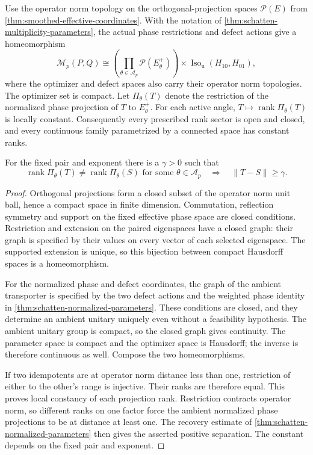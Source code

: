 \begin{theorem}
\label{thm:schatten-optimizer-topology}
Use the operator norm topology on the orthogonal-projection spaces
$\mathcal P(E)$ from \cref{thm:smoothed-effective-coordinates}.
With the notation of
\cref{thm:schatten-multiplicity-parameters}, the actual phase restrictions
and defect actions give a homeomorphism
\[
 \mathcal M_p(P,Q)\cong
 \left(\prod_{\theta\in\mathcal A_p}\mathcal P(E_\theta^+)\right)
       \times\operatorname{Iso}_{\mathrm u}(H_{10},H_{01}),
\]
where the optimizer and defect spaces also carry their operator norm
topologies. The optimizer set is compact. Let $\Pi_\theta(T)$ denote the
restriction of the normalized phase projection of $T$ to $E_\theta^+$.
For each active angle,
$T\mapsto\operatorname{rank}\Pi_\theta(T)$ is locally constant.
Consequently every prescribed rank sector is open and closed, and every
continuous family parametrized by a connected space has constant ranks.

For the fixed pair and exponent there is a $\gamma>0$ such that
\[
 \operatorname{rank}\Pi_\theta(T)\ne
 \operatorname{rank}\Pi_\theta(S)\text{ for some }\theta\in\mathcal A_p
 \quad\Longrightarrow\quad \|T-S\|\geq\gamma.
\]
\end{theorem}

\begin{proof}
Orthogonal projections form a closed subset of the operator norm unit
ball, hence a compact space in finite dimension. Commutation, reflection
symmetry and support on the fixed effective phase space are closed
conditions. Restriction and extension on the paired eigenspaces have a
closed graph: their graph is specified by their values on every vector
of each selected eigenspace. The supported extension is unique, so this
bijection between compact Hausdorff spaces is a homeomorphism.

For the normalized phase and defect coordinates, the graph of the
ambient transporter is specified by the two defect actions and the
weighted phase identity in \cref{thm:schatten-normalized-parameters}.
These conditions are closed, and they determine an ambient unitary
uniquely even without a feasibility hypothesis. The ambient unitary group
is compact, so the closed graph gives continuity. The parameter space
is compact and the optimizer space is Hausdorff; the inverse is therefore
continuous as well. Compose the two homeomorphisms.

If two idempotents are at operator norm distance less than one,
restriction of either to the other's range is injective. Their ranks
are therefore equal. This proves local constancy of each projection rank.
Restriction contracts operator norm, so different ranks on one factor
force the ambient normalized phase projections to be at distance at
least one. The recovery estimate of
\cref{thm:schatten-normalized-parameters} then gives the asserted positive
separation. The constant depends on the fixed pair and exponent.
\end{proof}

